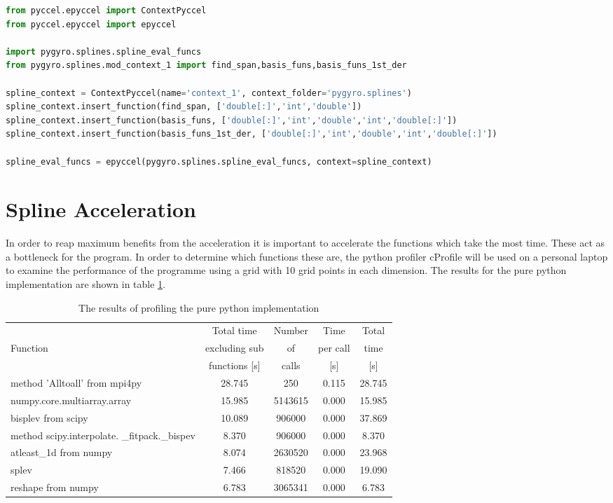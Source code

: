 \begin{lstlisting}[language=python,style=pythonStyle]
from pyccel.epyccel import ContextPyccel
from pyccel.epyccel import epyccel

import pygyro.splines.spline_eval_funcs
from pygyro.splines.mod_context_1 import find_span,basis_funs,basis_funs_1st_der

spline_context = ContextPyccel(name='context_1', context_folder='pygyro.splines')
spline_context.insert_function(find_span, ['double[:]','int','double'])
spline_context.insert_function(basis_funs, ['double[:]','int','double','int','double[:]'])
spline_context.insert_function(basis_funs_1st_der, ['double[:]','int','double','int','double[:]'])

spline_eval_funcs = epyccel(pygyro.splines.spline_eval_funcs, context=spline_context)
\end{lstlisting}


\section{Spline Acceleration}

In order to reap maximum benefits from the acceleration it is important to accelerate the functions which take the most time. These act as a bottleneck for the program. In order to determine which functions these are, the python profiler cProfile will be used on a personal laptop to examine the performance of the programme using a grid with 10 grid points in each dimension. The results for the pure python implementation are shown in table \ref{tab::pure python profile}.

\begin{table}[ht]
 \begin{tabular}{|m{}|c|c|c|c|}
  \hline
          & Total time & Number & Time & Total \\
  Function & excluding sub & of & per call & time \\
          & functions [s] & calls & [s] & [s] \\
  \hline
  \hline
  method 'Alltoall' from mpi4py & 28.745 & 250 & 0.115 & 28.745 \\
  \hline
  numpy.core.multiarray.array & 15.985 & 5143615 & 0.000 & 15.985 \\
  \hline
  bisplev from scipy & 10.089 & 906000 & 0.000 & 37.869\\
  \hline
  method scipy.interpolate. \_fitpack.\_bispev & 8.370 & 906000 & 0.000 & 8.370\\
  \hline
  atleast\_1d from numpy & 8.074 & 2630520 & 0.000 & 23.968\\
  \hline
  splev & 7.466 & 818520 & 0.000 & 19.090\\
  \hline
  reshape from numpy & 6.783 & 3065341 & 0.000 & 6.783\\
  \hline
 \end{tabular}
\caption{\label{tab::pure python profile} The results of profiling the pure python implementation}
\end{table}

